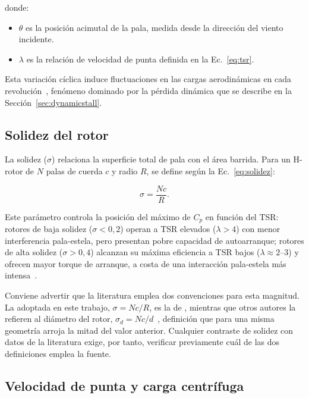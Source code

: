 donde:
\begin{itemize}
    \item $\theta$ es la posición acimutal de la pala, medida desde la dirección del viento incidente.
    \item $\lambda$ es la relación de velocidad de punta definida en la Ec.~\ref{eq:tsr}.
\end{itemize}

Esta variación cíclica induce fluctuaciones en las cargas aerodinámicas en cada revolución~\parencite{Bianchini2015,Borg2015}, fenómeno dominado por la pérdida dinámica que se describe en la Sección~\ref{sec:dynamicstall}.

\subsection{Solidez del rotor}
\label{sec:solidez}

La solidez ($\sigma$) relaciona la superficie total de pala con el área barrida. Para un H-rotor de $N$ palas de cuerda $c$ y radio $R$, se define según la Ec.~\ref{eq:solidez}:

\begin{equation}
\sigma = \frac{Nc}{R}.
\label{eq:solidez}
\end{equation}

Este parámetro controla la posición del máximo de $C_p$ en función del TSR: rotores de baja solidez ($\sigma < 0{,}2$) operan a TSR elevados ($\lambda > 4$) con menor interferencia pala-estela, pero presentan pobre capacidad de autoarranque; rotores de alta solidez ($\sigma > 0{,}4$) alcanzan su máxima eficiencia a TSR bajos ($\lambda \approx 2\text{--}3$) y ofrecen mayor torque de arranque, a costa de una interacción pala-estela más intensa~\parencite{Essahraoui2026}.

Conviene advertir que la literatura emplea dos convenciones para esta magnitud. La adoptada en este trabajo, $\sigma = Nc/R$, es la de \textcite{Essahraoui2026}, mientras que otros autores la refieren al diámetro del rotor, $\sigma_d = Nc/d$~\parencite{Rezaeiha2018,Miller2021}, definición que para una misma geometría arroja la mitad del valor anterior. Cualquier contraste de solidez con datos de la literatura exige, por tanto, verificar previamente cuál de las dos definiciones emplea la fuente.

\subsection{Velocidad de punta y carga centrífuga}
\label{sec:vtip}

